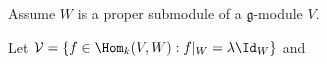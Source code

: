 \documentclass{article}
\begin{document}
Assume $W$ is a proper submodule of a $\mathfrak g$-module $V$.

Let $\mathcal V = \{ f \in \Hom_k(V,W) : f|_W = \lambda \Id_W \}$ and
\end{document}
